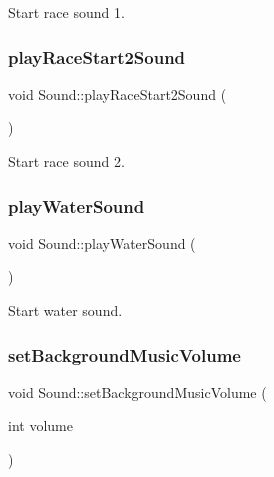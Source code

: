 Start race sound 1. 

\mbox{\label{class_sound_a7dfc37a9a9e395e8b68a0d59009b8984}} 
\subsubsection{\texorpdfstring{playRaceStart2Sound}{playRaceStart2Sound}}
{\footnotesize\ttfamily void Sound\+::play\+Race\+Start2\+Sound (\begin{DoxyParamCaption}{ }\end{DoxyParamCaption})\hspace{0.3cm}{\ttfamily [slot]}}



Start race sound 2. 

\mbox{\label{class_sound_a2a51decbd81c7f83cb94ded9c6d9728c}} 
\subsubsection{\texorpdfstring{playWaterSound}{playWaterSound}}
{\footnotesize\ttfamily void Sound\+::play\+Water\+Sound (\begin{DoxyParamCaption}{ }\end{DoxyParamCaption})\hspace{0.3cm}{\ttfamily [slot]}}



Start water sound. 

\mbox{\label{class_sound_a983f09cee9134f759620518b4c73ca8d}} 
\subsubsection{\texorpdfstring{setBackgroundMusicVolume}{setBackgroundMusicVolume}}
{\footnotesize\ttfamily void Sound\+::set\+Background\+Music\+Volume (\begin{DoxyParamCaption}\item[{int}]{volume }\end{DoxyParamCaption})\hspace{0.3cm}{\ttfamily [slot]}}



